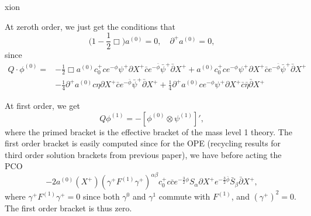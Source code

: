 xion\documentclass[12pt]{article}
\def\be{\begin{equation}}
\def\ee{\end{equation}}
\numberwithin{equation}{section}
\begin{document}
At zeroth order, we just get the conditions that
\be
    \big(1-\frac{1}{2}\Box\big)a^{(0)}=0,\quad\partial^+a^{(0)}=0,
\ee
since
\be
\begin{aligned}
	Q \cdot \phi^{(0)} = &-\frac{1}{2} \Box a^{(0)} c_0^+ c e^{-\phi} \psi^+ \partial X^+ \bar{c} e^{-\bar{\phi}} \bar{\psi}^+ \bar{\partial} X^+ + a^{(0)} c_0^+ c e^{-\phi} \psi^+ \partial X^+ \bar{c} e^{-\bar{\phi}} \bar{\psi}^+ \bar{\partial} X^+ \\
			     &- \frac{1}{4} \partial^+ a^{(0)} c \eta \partial X^+ \bar{c} e^{-\bar{\phi}} \bar{\psi}^+ \bar{\partial} X^+ + \frac{1}{4} \partial^+ a^{(0)} c e^{-\phi} \psi^+ \partial X^+ \bar{c} \bar{\eta} \bar{\partial} X^+
\end{aligned}
\ee

At first order, we get
\be
Q\phi^{(1)} = - [\phi^{(0)} \otimes \psi^{(1)}]',
\ee
where the primed bracket is the effective bracket of the mass level 1 theory. The first order bracket is easily computed since for the OPE (recycling results for third order solution brackets from previous paper), we have before acting the PCO
\be
-2 a^{(0)}(X^+) (\gamma^+ F^{(1)} \gamma^+)^{\alpha \beta} c_0^+ c\bar{c} e^{-\frac{3}{2}\phi} S_\alpha \partial X^+ e^{-\frac{3}{2}\bar{\phi}} \bar{S}_\beta \bar{\partial} X^+,
\ee
where $\gamma^+ F^{(1)} \gamma^+ = 0$ since both $\gamma^0$ and $\gamma^1$ commute with $F^{(1)}$, and $(\gamma^+)^2 = 0$. The first order bracket is thus zero.
\end{document}
